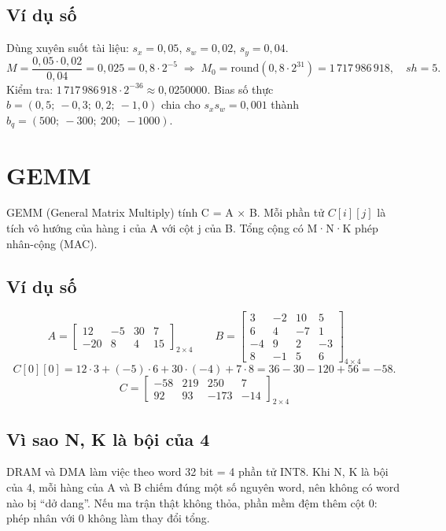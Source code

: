 \documentclass[10pt,a4paper]{article}
\begin{document}
\subsection{Ví dụ số}
Dùng xuyên suốt tài liệu: $s_x = 0{,}05$, $s_w = 0{,}02$, $s_y = 0{,}04$.
\[
M = \frac{0{,}05 \cdot 0{,}02}{0{,}04} = 0{,}025 = 0{,}8 \cdot 2^{-5}
\;\Rightarrow\; M_0 = \text{round}(0{,}8 \cdot 2^{31}) = 1\,717\,986\,918,\quad sh = 5.
\]
Kiểm tra: $1\,717\,986\,918 \cdot 2^{-36} ≈ 0{,}0250000$. Bias số thực $b = (0{,}5;\ -0{,}3;\ 0{,}2;\ -1{,}0)$ chia cho $s_x s_w = 0{,}001$ thành $b_q = (500;\ -300;\ 200;\ -1000)$.

\section{GEMM}\label{sec:4}

\begin{keypoint}
GEMM (General Matrix Multiply) tính C = A × B. Mỗi phần tử $C[i][j]$ là tích vô hướng của hàng i của A với cột j của B. Tổng cộng có M·N·K phép nhân-cộng (MAC).
\end{keypoint}

\eqbox{\[
C[i][j] = \sum_{k=0}^{K-1} A[i][k]\cdot B[k][j], \qquad A, B \in \text{INT8},\ C \in \text{INT32}.
\]}

\subsection{Ví dụ số}
\[
A = \begin{bmatrix} 12 & -5 & 30 & 7 \\ -20 & 8 & 4 & 15 \end{bmatrix}_{2\times 4}
\qquad
B = \begin{bmatrix} 3 & -2 & 10 & 5 \\ 6 & 4 & -7 & 1 \\ -4 & 9 & 2 & -3 \\ 8 & -1 & 5 & 6 \end{bmatrix}_{4\times 4}
\]
\[
C[0][0] = 12\cdot 3 + (-5)\cdot 6 + 30\cdot(-4) + 7\cdot 8 = 36 - 30 - 120 + 56 = -58.
\]
\[
C = \begin{bmatrix} -58 & 219 & 250 & 7 \\ 92 & 93 & -173 & -14 \end{bmatrix}_{2\times 4}
\]

\subsection{Vì sao N, K là bội của 4}
DRAM và DMA làm việc theo word 32 bit = 4 phần tử INT8. Khi N, K là bội của 4, mỗi hàng của A và B chiếm đúng một số nguyên word, nên không có word nào bị “dở dang”. Nếu ma trận thật không thỏa, phần mềm đệm thêm cột 0: phép nhân với 0 không làm thay đổi tổng.
\end{document}
